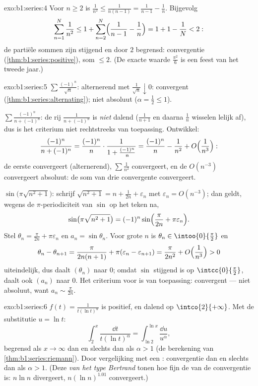 \begin{solution}{exo:b1:series:4}
Voor $n \geq 2$ is $\frac{1}{n^2} \leq \frac{1}{n(n-1)} =
\frac{1}{n-1} - \frac1n$. Bijgevolg
\[
\sum_{n=1}^{N} \frac{1}{n^2} \leq 1 + \sum_{n=2}^{N}
\Bigl(\frac{1}{n-1} - \frac1n\Bigr) = 1 + 1 - \frac1N < 2 :
\]
de partiële sommen zijn stijgend en door $2$ begrensd: convergentie
(\cref{thm:b1:series:positive}), som $\leq 2$. (De exacte waarde
$\frac{\pi^2}{6}$ is een feest van het tweede jaar.)
\end{solution}

\begin{solution}{exo:b1:series:5}
$\sum \frac{(-1)^n}{\sqrt n}$: alternerend met $\frac{1}{\sqrt n}
\downarrow 0$: convergent (\cref{thm:b1:series:alternating}); niet
absoluut ($\alpha = \frac12 \leq 1$).

$\sum \frac{(-1)^n}{n + (-1)^n}$: de rij $\frac{1}{n + (-1)^n}$ is
\emph{niet} dalend ($\frac{1}{n+1}$ en daarna $\frac{1}{n}$
wisselen lelijk af), dus is het criterium niet rechtstreeks van
toepassing. Ontwikkel:
\[
\frac{(-1)^n}{n + (-1)^n}
= \frac{(-1)^n}{n}\cdot\frac{1}{1 + \frac{(-1)^n}{n}}
= \frac{(-1)^n}{n} - \frac{1}{n^2} +
O\Bigl(\frac{1}{n^3}\Bigr):
\]
de eerste  convergeert (alternerend), $\sum \frac{1}{n^2}$
convergeert, en de $O(n^{-3})$ convergeert absoluut: de som van drie
convergente  convergeert.

$\sin\bigl(\pi\sqrt{n^2+1}\bigr)$: schrijf $\sqrt{n^2 + 1} = n +
\frac{1}{2n} + \varepsilon_n$ met $\varepsilon_n = O(n^{-3})$; dan
geldt, wegens de $\pi$-periodiciteit van $\sin$ op het teken na,
\[
\sin\bigl(\pi\sqrt{n^2+1}\bigr)
= (-1)^n \sin\Bigl(\frac{\pi}{2n} + \pi\varepsilon_n\Bigr) .
\]
Stel $\theta_n = \frac{\pi}{2n} + \pi\varepsilon_n$ en $a_n =
\sin\theta_n$. Voor grote $n$ is $\theta_n \in
\intoo{0}{\frac\pi2}$ en
\[
\theta_n - \theta_{n+1} = \frac{\pi}{2n(n+1)} +
\pi(\varepsilon_n - \varepsilon_{n+1})
= \frac{\pi}{2n^2} + O\Bigl(\frac{1}{n^3}\Bigr) > 0
\]
uiteindelijk, dus daalt $(\theta_n)$ naar $0$; omdat $\sin$ stijgend
is op $\intcc{0}{\frac\pi2}$, daalt ook $(a_n)$ naar $0$. Het
criterium voor  is van toepassing: convergent
--- niet absoluut, want $a_n \sim \frac{\pi}{2n}$.
\end{solution}

\begin{solution}{exo:b1:series:6}
$f(t) = \frac{1}{t(\ln t)^\alpha}$ is positief,  en dalend op
$\intco{2}{+\infty}$. Met de substitutie $u = \ln t$:
\[
\int_2^x \frac{\dd t}{t(\ln t)^\alpha}
= \int_{\ln 2}^{\ln x} \frac{\dd u}{u^\alpha},
\]
begrensd als $x \to \infty$ dan en slechts dan als $\alpha > 1$ (de
berekening van \cref{thm:b1:series:riemann}). Door vergelijking met
een : convergentie dan en slechts dan als $\alpha > 1$.
(Deze  \emph{van het type Bertrand} tonen hoe fijn de 
van de convergentie is: $n\ln n$ divergeert, $n(\ln n)^{1.01}$
convergeert.)
\end{solution}

